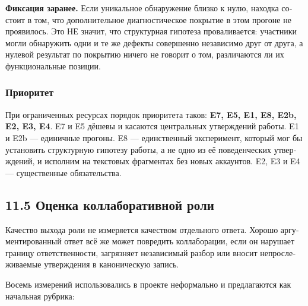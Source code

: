 \begin{russian}
\textbf{Фиксация заранее.} Если уникальное обнаружение близко к нулю, находка состоит в том, что дополнительное диагностическое покрытие в этом прогоне не проявилось. Это НЕ значит, что структурная гипотеза  проваливается: участники могли обнаружить одни и те же дефекты совершенно независимо друг от друга, а нулевой результат по покрытию ничего не говорит о том, различаются ли их функциональные позиции.


\subsubsection*{Приоритет}
\label{sec:ru:x--25}

При ограниченных ресурсах порядок приоритета таков: \textbf{E7, E5, E1, E8, E2b, E2, E3, E4}. E7 и E5 дёшевы и касаются центральных утверждений работы. E1 и E2b — единичные прогоны. E8 — единственный эксперимент, который мог бы установить структурную гипотезу работы, а не одно из её поведенческих утверждений, и исполним на текстовых фрагментах без новых аккаунтов. E2, E3 и E4 — существенные обязательства.


\subsection*{11.5 Оценка коллаборативной роли}
\label{sec:ru:11.5}

Качество выхода роли не измеряется качеством отдельного ответа. Хорошо аргументированный ответ всё же может повредить коллаборации, если он нарушает границу ответственности, загрязняет независимый разбор или вносит непрослеживаемые утверждения в каноническую запись.

Восемь измерений использовались в проекте неформально и предлагаются как начальная рубрика:


\end{russian}
